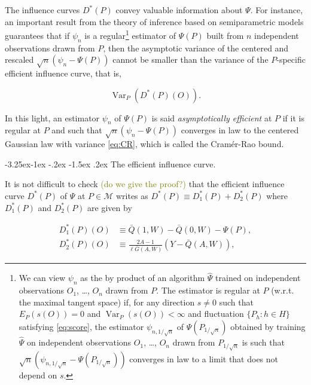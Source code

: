 \documentclass[]{article}
\makeatletter
\let\rmarkdownfootnote\footnote%
\def\footnote{\protect\rmarkdownfootnote}
\renewcommand\subsection{\@startsection{subsection}{3}{\z@}%
                                     {-3.25ex\@plus -1ex \@minus -.2ex}%
                                     {-1.5ex \@plus .2ex}%
                                     {\normalfont\normalsize\bfseries}}
\DeclareMathOperator{\Dirac}{Dirac}
\DeclareMathOperator{\Var}{Var}
\newcommand{\calM}{\mathcal{M}}
\newcommand{\Gbar}{\bar{G}}
\newcommand{\Psihat}{\widehat{\Psi}}
\newcommand{\Qbar}{\bar{Q}}
\newcommand{\tcg}[1]{\textcolor{olive}{#1}}
\theoremstyle{definition}
\theoremstyle{definition}
\theoremstyle{definition}
\theoremstyle{remark}
\makeatother
\begin{document}
The influence curves \(D^{*}(P)\) convey valuable information about
\(\Psi\). For instance, an important result from the theory of inference
based on semiparametric models guarantees that if \(\psi_{n}\) is a
regular\footnote{We
can view  $\psi_{n}$ as the  by product of  an algorithm $\Psihat$  trained on
independent observations $O_{1}$, \ldots, $O_{n}$ drawn from $P$.  
The estimator is regular at $P$ (w.r.t. the maximal tangent space) if, for any
direction  $s\neq 0$  such that  $E_{P}  (s(O)) =  0$ and  $\Var_{P} (s(O))  <
\infty$ and fluctuation $\{P_{h} : h \in H\}$ satisfying \eqref{eq:score}, the
estimator $\psi_{n,1/\sqrt{n}}$ of $\Psi(P_{1/\sqrt{n}})$ obtained by training
$\Psihat$  on independent  observations  $O_{1}$, \ldots,  $O_{n}$ drawn  from
$P_{1/\sqrt{n}}$    is   such    that    $\sqrt{n}   (\psi_{n,1/\sqrt{n}}    -
\Psi(P_{1/\sqrt{n}}))$ converges  in law to  a limit  that does not  depend on
$s$.} estimator of \(\Psi(P)\) built from \(n\) independent observations
drawn from \(P\), then the asymptotic variance of the centered and
rescaled \(\sqrt{n} (\psi_{n} - \Psi(P))\) cannot be smaller than the
variance of the \(P\)-specific efficient influence curve, that is,

\begin{equation}\label{eq:CR}\Var_{P}(D^{*}(P)(O)).\end{equation}

In this light, an estimator \(\psi_{n}\) of \(\Psi(P)\) is said
\textit{asymptotically efficient} at \(P\) if it is regular at \(P\) and
such that \(\sqrt{n} (\psi_{n} - \Psi(P))\) converges in law to the
centered Gaussian law with variance \eqref{eq:CR}, which is called the
Cramér-Rao bound.

\subsection{The efficient influence curve.}
\label{subsec:parameter:third}

It is not difficult to check \tcg{(do  we give the proof?)} that the
efficient influence curve \(D^{*}(P)\) of \(\Psi\) at \(P \in \calM\)
writes as \(D^{*}(P) \equiv D_{1}^{*} (P) + D_{2}^{*} (P)\) where
\(D_{1}^{*} (P)\) and \(D_{2}^{*} (P)\) are given by

\begin{align*}D_{1}^{*}(P) (O)  &\equiv \Qbar(1,W)  - \Qbar(0,W)  - \Psi(P),\\
D_{2}^{*}(P)     (O)     &\equiv      \frac{2A-1}{\ell\Gbar(A,W)}     (Y     -
\Qbar(A,W)),\end{align*}
\end{document}
